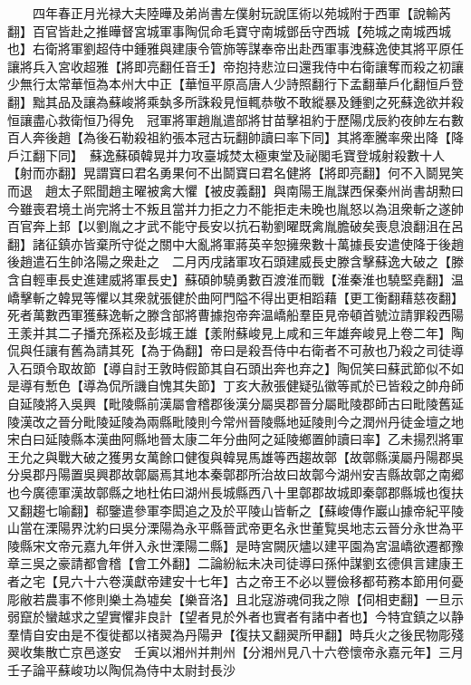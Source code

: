 　　四年春正月光禄大夫陸曄及弟尚書左僕射玩說匡術以苑城附于西軍【說輸芮翻】百官皆赴之推曄督宮城軍事陶侃命毛寶守南城鄧岳守西城【苑城之南城西城也】右衛將軍劉超侍中鍾雅與建康令管斾等謀奉帝出赴西軍事洩蘇逸使其將平原任讓將兵入宮收超雅【將即亮翻任音壬】帝抱持悲泣曰還我侍中右衛讓奪而殺之初讓少無行太常華恒為本州大中正【華恒平原高唐人少詩照翻行下孟翻華戶化翻恒戶登翻】黜其品及讓為蘇峻將乘埶多所誅殺見恒輒恭敬不敢縱暴及鍾劉之死蘇逸欲并殺恒讓盡心救衛恒乃得免　冠軍將軍趙胤遣部將甘苗擊祖約于歷陽戊辰約夜帥左右數百人奔後趙【為後石勒殺祖約張本冠古玩翻帥讀曰率下同】其將牽騰率衆出降【降戶江翻下同】　蘇逸蘇碩韓晃并力攻臺城焚太極東堂及祕閣毛寶登城射殺數十人【射而亦翻】晃謂寶曰君名勇果何不出鬬寶曰君名健將【將即亮翻】何不入鬬晃笑而退　趙太子熙聞趙主曜被禽大懼【被皮義翻】與南陽王胤謀西保秦州尚書胡勲曰今雖喪君境土尚完將士不叛且當并力拒之力不能拒走未晚也胤怒以為沮衆斬之遂帥百官奔上邽【以劉胤之才武不能守長安以抗石勒劉曜既禽胤膽破矣喪息浪翻沮在呂翻】諸征鎮亦皆棄所守從之關中大亂將軍蔣英辛恕擁衆數十萬據長安遣使降于後趙後趙遣石生帥洛陽之衆赴之　二月丙戌諸軍攻石頭建威長史滕含擊蘇逸大破之【滕含自輕車長史進建威將軍長史】蘇碩帥驍勇數百渡淮而戰【淮秦淮也驍堅堯翻】温嶠擊斬之韓晃等懼以其衆就張健於曲阿門隘不得出更相蹈藉【更工衡翻藉慈夜翻】死者萬數西軍獲蘇逸斬之滕含部將曹據抱帝奔温嶠船羣臣見帝頓首號泣請罪殺西陽王羕并其二子播充孫崧及彭城王雄【羕附蘇峻見上咸和三年雄奔峻見上卷二年】陶侃與任讓有舊為請其死【為于偽翻】帝曰是殺吾侍中右衛者不可赦也乃殺之司徒導入石頭令取故節【導自討王敦時假節其自石頭出奔也弃之】陶侃笑曰蘇武節似不如是導有慙色【導為侃所譏自愧其失節】丁亥大赦張健疑弘徽等貳於已皆殺之帥舟師自延陵將入吳興【毗陵縣前漢屬會稽郡後漢分屬吳郡晉分屬毗陵郡師古曰毗陵舊延陵漢改之晉分毗陵延陵為兩縣毗陵則今常州晉陵縣地延陵則今之潤州丹徒金壇之地宋白曰延陵縣本漢曲阿縣地晉太康二年分曲阿之延陵鄉置帥讀曰率】乙未揚烈將軍王允之與戰大破之獲男女萬餘口健復與韓晃馬雄等西趨故鄣【故鄣縣漢屬丹陽郡吳分吳郡丹陽置吳興郡故鄣屬焉其地本秦鄣郡所治故曰故鄣今湖州安吉縣故鄣之南郷也今廣德軍漢故鄣縣之地杜佑曰湖州長城縣西八十里鄣郡故城即秦鄣郡縣城也復扶又翻趨七喻翻】郗鑒遣參軍李閎追之及於平陵山皆斬之【蘇峻傳作巖山據帝紀平陵山當在溧陽界沈約曰吳分溧陽為永平縣晉武帝更名永世董覧吳地志云晉分永世為平陵縣宋文帝元嘉九年併入永世溧陽二縣】是時宮闕灰燼以建平園為宮温嶠欲遷都豫章三吳之豪請都會稽【會工外翻】二論紛紜未决司徒導曰孫仲謀劉玄德俱言建康王者之宅【見六十六卷漢獻帝建安十七年】古之帝王不必以豐儉移都苟務本節用何憂彫敝若農事不修則樂土為墟矣【樂音洛】且北寇游魂伺我之隙【伺相吏翻】一旦示弱竄於蠻越求之望實懼非良計【望者見於外者也實者有諸中者也】今特宜鎮之以静羣情自安由是不復徙都以禇翜為丹陽尹【復扶又翻翜所甲翻】時兵火之後民物彫殘翜收集散亡京邑遂安　壬寅以湘州并荆州【分湘州見八十六卷懷帝永嘉元年】三月壬子論平蘇峻功以陶侃為侍中太尉封長沙

